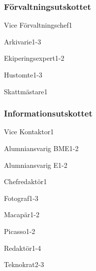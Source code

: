 \documentclass[10pt]{article}
\begin{document}
\newpage

\subsubsection{Förvaltningsutskottet}
\begin{vallista}
    \begin{post}{Vice Förvaltningschef}{1}

    \end{post}
    \begin{post}{Arkivarie}{1-3}

    \end{post}
    \begin{post}{Ekiperingsexpert}{1-2}

    \end{post}
    \begin{post}{Hustomte}{1-3}

    \end{post}
    \begin{post}{Skattmästare}{1}
    \end{post}
\end{vallista}

\subsubsection{Informationsutskottet}
\begin{vallista}
    \begin{post}{Vice Kontaktor}{1}

    \end{post}
    \begin{post}{Alumniansvarig BME}{1-2}
    \end{post}
    \begin{post}{Alumniansvarig E}{1-2}
    \end{post}
    \begin{post}{Chefredaktör}{1}
    \end{post}
    \begin{post}{Fotograf}{1-3}
    \end{post}
    \begin{post}{Macapär}{1-2}
    \end{post}
    \begin{post}{Picasso}{1-2}
    \end{post}
    \begin{post}{Redaktör}{1-4}
    \end{post}
    \begin{post}{Teknokrat}{2-3}
    \end{post}
\end{vallista}
\end{document}
